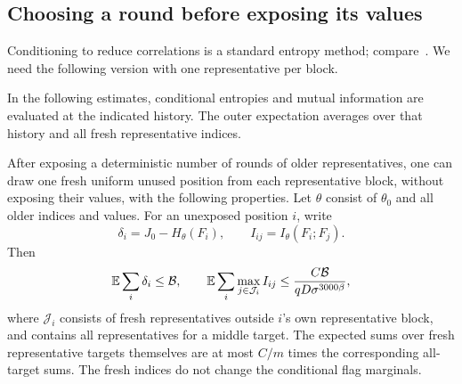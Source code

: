 \subsection{Choosing a round before exposing its values}

Conditioning to reduce correlations is a standard entropy method;
compare~\cite[Lemma~4.5]{RaghavendraTan2011}.  We need the following
version with one representative per block.

In the following estimates, conditional entropies and mutual information
are evaluated at the indicated history.  The outer expectation averages
over that history and all fresh representative indices.

\begin{lemma}\label{lem:decoupling}
After exposing a deterministic number of rounds of older representatives,
one can draw one fresh uniform unused position from each representative
block, without exposing their values, with the following properties.
Let $\theta$ consist of $\theta_0$ and all older indices and values.
For an unexposed position $i$, write
\[
 \delta_i=J_0-H_\theta(F_i),\qquad
 I_{ij}=I_\theta(F_i;F_j).
\]
Then
\begin{equation}\label{eq:decoupling-bounds}
 \mathbb E\sum_i\delta_i\le\mathcal B,\qquad
 \mathbb E\sum_i\max_{j\in\mathcal J_i}I_{ij}
 \le\frac{C\mathcal B}{qD\sigma^{3000\beta}},
\end{equation}
where $\mathcal J_i$ consists of fresh representatives outside $i$'s
own representative block, and contains all representatives for a middle
target.  The expected sums over fresh representative targets themselves
are at most $C/m$ times the corresponding all-target sums.
The fresh indices do not change the conditional flag marginals.
\end{lemma}

